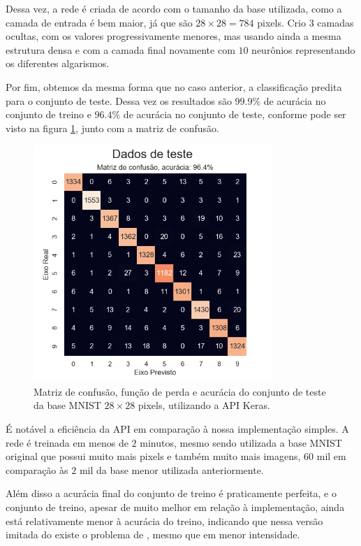 Dessa vez, a rede é criada de acordo com o tamanho da base utilizada, como a camada de entrada é bem maior, já que são ${28\times28 = 784}$ pixels. Crio $3$ camadas ocultas, com os valores progressivamente menores, mas usando ainda a mesma estrutura densa e com a camada final novamente com $10$ neurônios representando os diferentes algarismos.

Por fim, obtemos da mesma forma que no caso anterior, a classificação predita para o conjunto de teste. Dessa vez os resultados são $99.9\%$ de acurácia no conjunto de treino e $96.4\%$ de acurácia no conjunto de teste, conforme pode ser visto na figura \ref{fig:keras_test_2}, junto com a matriz de confusão.

\begin{figure}[htb]
\centering
\includegraphics[width=9cm]{figuras/keras_test_2}
\caption{Matriz de confusão, função de perda e acurácia do conjunto de teste da base MNIST ${28\times28}$ pixels, utilizando a API Keras.}
\label{fig:keras_test_2}
\end{figure}

É notável a eficiência da API em comparação à nossa implementação simples. A rede é treinada em menos de $2$ minutos, mesmo sendo utilizada a base MNIST original que possui muito mais pixels e também muito mais imagens, $60$ mil em comparação às $2$ mil da base menor utilizada anteriormente. 

Além disso a acurácia final do conjunto de treino é praticamente perfeita, e o conjunto de treino, apesar de muito melhor em relação à implementação, ainda está relativamente menor à acurácia do treino, indicando que nessa versão imitada do  existe o problema de , mesmo que em menor intensidade.

